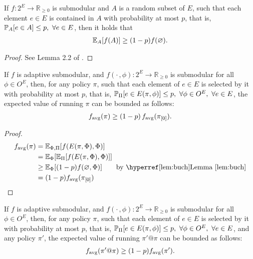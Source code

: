 \setcounter{lemma}{2}
\begin{lemma}\label{lem:buch}
  If $f : 2^E \to \mathbb{R}_{\geq 0}$ is submodular and $A$ is a random subset of $E$, such that each element $e \in E$ is contained in $A$ with probability at most $p$, that is, $\P[A]{e \in A} \leq p,\ \forall e \in E$, then it holds that
  \begin{align*}
    \E[A]{f(A)} \geq (1-p)f(\varnothing).
  \end{align*}
\end{lemma}
\begin{proof}
  See Lemma 2.2 of \citet{buchbinder14}.
\end{proof}

\begin{lemma}\label{lem:nmon}
  If $f$ is adaptive submodular, and $f(\cdot\,, \phi) : 2^E \to \mathbb{R}_{\geq 0}$ is submodular for all $\phi \in O^E$, then, for any policy $\pi$, such that each element of $e \in E$ is selected by it with probability at most $p$, that is, $\P[\Pi]{e \in E(\pi, \phi)} \leq p,\ \forall \phi \in O^E,\ \forall e \in E$, the expected value of running $\pi$ can be bounded as follows:
\begin{align*}
  f_{\mathrm{avg}}(\pi) \geq (1-p)\,f_{\mathrm{avg}}(\pi_{[0]}).
\end{align*}
\end{lemma}
\begin{proof}
  \begin{align*}
    \favg(\pi) &= \E[\Phi,\Pi]{f(E(\pi, \Phi), \Phi)}\\
               &= \E[\Phi]{\E[\Pi]{f(E(\pi, \Phi), \Phi)}}\\
               &\geq \E[\Phi]{(1-p)f(\varnothing, \Phi)} \tag*{by \lemmaref{lem:buch}}\\
               &= (1-p)\favg(\pio)
  \end{align*}
\end{proof}

\begin{cor}\label{cor:nmon}
  If $f$ is adaptive submodular, and $f(\cdot\,, \phi) : 2^E \to \mathbb{R}_{\geq 0}$ is submodular for all $\phi \in O^E$, then, for any policy $\pi$, such that each element of $e \in E$ is selected by it with probability at most $p$, that is, $\P[\Pi]{e \in E(\pi, \phi)} \leq p,\ \forall \phi \in O^E,\ \forall e \in E$, and any policy $\pi'$, the expected value of running $\pi'@\pi$ can be bounded as follows:
\begin{align*}
  f_{\mathrm{avg}}(\pi' @ \pi) \geq (1-p)f_{\mathrm{avg}}(\pi').
\end{align*}
\end{cor}


